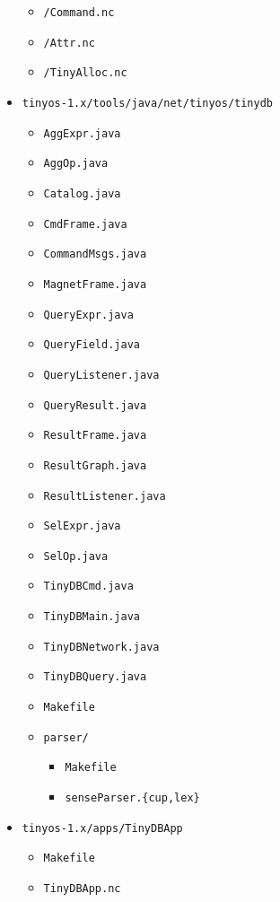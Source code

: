 \documentclass[11pt]{article}
\renewcommand{\baselinestretch}{1.2}
\newcommand{\docroot}{tinyos-1.x}
\newcommand{\java}{tinyos-1.x/tools/java}
\begin{document}
\begin{itemize}
\begin{itemize}
\item {\tt /Command.nc}
\item {\tt /Attr.nc}
\item {\tt /TinyAlloc.nc}
\end{itemize}
\item {\tt {\java}/net/tinyos/tinydb}
\begin{itemize}
\item {\tt AggExpr.java}
\item {\tt AggOp.java}
\item {\tt Catalog.java}
\item {\tt CmdFrame.java}
\item {\tt CommandMsgs.java}
\item {\tt MagnetFrame.java}
\item {\tt QueryExpr.java}
\item {\tt QueryField.java}
\item {\tt QueryListener.java}
\item {\tt QueryResult.java}
\item {\tt ResultFrame.java}
\item {\tt ResultGraph.java}
\item {\tt ResultListener.java}
\item {\tt SelExpr.java}
\item {\tt SelOp.java}
\item {\tt TinyDBCmd.java}
\item {\tt TinyDBMain.java}
\item {\tt TinyDBNetwork.java}
\item {\tt TinyDBQuery.java}
\item {\tt Makefile}
\item {\tt parser/}
\begin{itemize}
\item {\tt Makefile}
\item {\tt senseParser.\{cup,lex\}}
\end{itemize}
\end{itemize}
\item {\tt {\docroot}/apps/TinyDBApp}
\begin{itemize}
\item {\tt Makefile}
\item {\tt TinyDBApp.nc}
\end{itemize}
\end{itemize}
\renewcommand{\baselinestretch}{1.2}\rm
\end{document}
